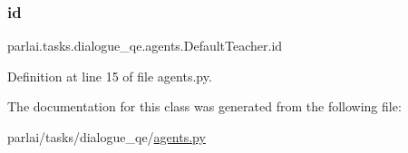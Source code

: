 \subsubsection{\texorpdfstring{id}{id}}
{\footnotesize\ttfamily parlai.\+tasks.\+dialogue\+\_\+qe.\+agents.\+Default\+Teacher.\+id}



Definition at line 15 of file agents.\+py.



The documentation for this class was generated from the following file\+:\begin{DoxyCompactItemize}
\item 
parlai/tasks/dialogue\+\_\+qe/\hyperlink{parlai_2tasks_2dialogue__qe_2agents_8py}{agents.\+py}\end{DoxyCompactItemize}
